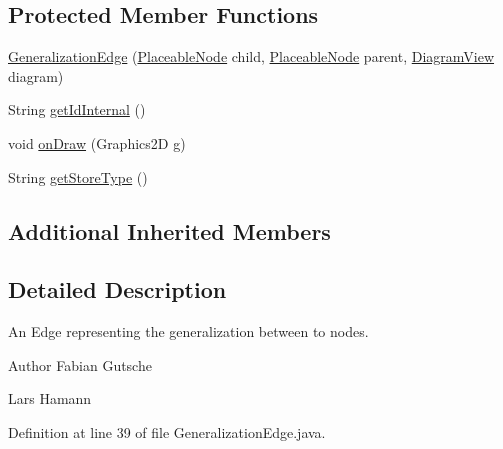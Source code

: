 \subsection*{Protected Member Functions}
\begin{DoxyCompactItemize}
\item 
\hyperlink{classorg_1_1tzi_1_1use_1_1gui_1_1views_1_1diagrams_1_1elements_1_1edges_1_1_generalization_edge_aa9509a996e6bb424dd882c6709be9823}{Generalization\-Edge} (\hyperlink{classorg_1_1tzi_1_1use_1_1gui_1_1views_1_1diagrams_1_1elements_1_1_placeable_node}{Placeable\-Node} child, \hyperlink{classorg_1_1tzi_1_1use_1_1gui_1_1views_1_1diagrams_1_1elements_1_1_placeable_node}{Placeable\-Node} parent, \hyperlink{classorg_1_1tzi_1_1use_1_1gui_1_1views_1_1diagrams_1_1_diagram_view}{Diagram\-View} diagram)
\item 
String \hyperlink{classorg_1_1tzi_1_1use_1_1gui_1_1views_1_1diagrams_1_1elements_1_1edges_1_1_generalization_edge_a3e5671a26554cb948e20e13262f5fcf6}{get\-Id\-Internal} ()
\item 
void \hyperlink{classorg_1_1tzi_1_1use_1_1gui_1_1views_1_1diagrams_1_1elements_1_1edges_1_1_generalization_edge_a100fa0cfc8c327356351a89640fccc85}{on\-Draw} (Graphics2\-D g)
\item 
String \hyperlink{classorg_1_1tzi_1_1use_1_1gui_1_1views_1_1diagrams_1_1elements_1_1edges_1_1_generalization_edge_a68d31871fca901f2c22a4b8af281f5df}{get\-Store\-Type} ()
\end{DoxyCompactItemize}
\subsection*{Additional Inherited Members}


\subsection{Detailed Description}
An Edge representing the generalization between to nodes.

\begin{DoxyAuthor}{Author}
Fabian Gutsche 

Lars Hamann 
\end{DoxyAuthor}


Definition at line 39 of file Generalization\-Edge.\-java.



